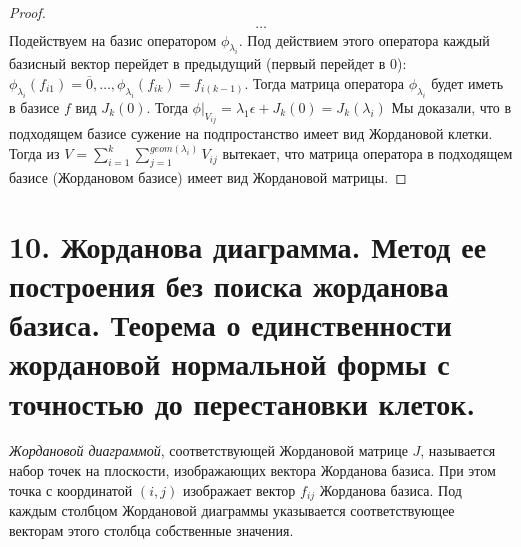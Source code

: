 \begin{proof}
\begin{gather*}
        \dots
    \end{gather*}
    Подействуем на базис оператором $\phi_{\lambda_i}$. Под действием этого оператора каждый базисный 
    вектор перейдет в предыдущий (первый перейдет в $0$): $\phi_{\lambda_i}(f_{i1}) = \overline{0}, \dots, \phi_{\lambda_i}(f_{ik}) = f_{i(k - 1)}$. 
    Тогда матрица оператора $\phi_{\lambda_i}$ будет иметь в базисе $f$ вид $J_k(0)$.
    Тогда $\phi \vert_{V_{ij}} = \lambda_1 \epsilon + J_k(0) = J_k(\lambda_i)$
    Мы доказали, что в подходящем базисе сужение на подпростанство имеет вид Жордановой клетки. Тогда из
    $V = \displaystyle\sum_{i = 1}^{k} \displaystyle\sum_{j = 1}^{geom(\lambda_i)} V_{ij}$
    вытекает, что матрица оператора в подходящем базисе (Жордановом базисе) имеет вид Жордановой матрицы.
\end{proof}

\section{10. Жорданова диаграмма. Метод ее построения без поиска жорданова базиса. Теорема о единственности жордановой нормальной формы с точностью до перестановки клеток.}

\begin{definition}
    \textit{Жордановой диаграммой}, соответствующей Жордановой матрице $J$, называется набор точек на плоскости, изображающих вектора Жорданова базиса. При этом точка с координатой $(i, j)$ 
    изображает вектор $f_{ij}$ Жорданова базиса. Под каждым столбцом Жордановой диаграммы указывается соответствующее векторам этого 
    столбца собственные значения.
\end{definition}

